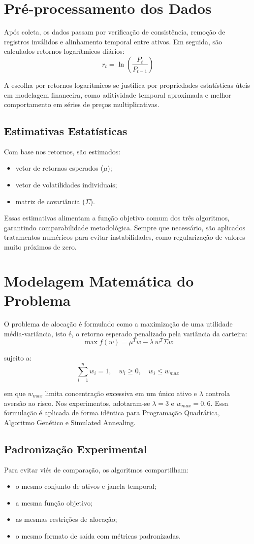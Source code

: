\documentclass[
  12pt,
  oneside,
  a4paper,
  brazil
]{abntex2}
\begin{document}
\section{Pré-processamento dos Dados}
Após coleta, os dados passam por verificação de consistência, remoção de registros inválidos e alinhamento temporal entre ativos. Em seguida, são calculados retornos logarítmicos diários:
\[
r_t = \ln\left(\frac{P_t}{P_{t-1}}\right)
\]

A escolha por retornos logarítmicos se justifica por propriedades estatísticas úteis em modelagem financeira, como aditividade temporal aproximada e melhor comportamento em séries de preços multiplicativas.

\subsection{Estimativas Estatísticas}
Com base nos retornos, são estimados:
\begin{itemize}
  \item vetor de retornos esperados ($\mu$);
  \item vetor de volatilidades individuais;
  \item matriz de covariância ($\Sigma$).
\end{itemize}

Essas estimativas alimentam a função objetivo comum dos três algoritmos, garantindo comparabilidade metodológica. Sempre que necessário, são aplicados tratamentos numéricos para evitar instabilidades, como regularização de valores muito próximos de zero.

\section{Modelagem Matemática do Problema}
O problema de alocação é formulado como a maximização de uma utilidade média-variância, isto é, o retorno esperado penalizado pela variância da carteira:
\[
\max f(w)=\mu^T w-\lambda\, w^T\Sigma w
\]

sujeito a:
\[
\sum_{i=1}^{n}w_i=1, \quad w_i\geq 0, \quad w_i\leq w_{max}
\]

em que $w_{max}$ limita concentração excessiva em um único ativo e $\lambda$ controla aversão ao risco. Nos experimentos, adotaram-se $\lambda = 3$ e $w_{max} = 0{,}6$. Essa formulação é aplicada de forma idêntica para Programação Quadrática, Algoritmo Genético e Simulated Annealing.

\subsection{Padronização Experimental}
Para evitar viés de comparação, os algoritmos compartilham:
\begin{itemize}
  \item o mesmo conjunto de ativos e janela temporal;
  \item a mesma função objetivo;
  \item as mesmas restrições de alocação;
  \item o mesmo formato de saída com métricas padronizadas.
\end{itemize}
\end{document}
